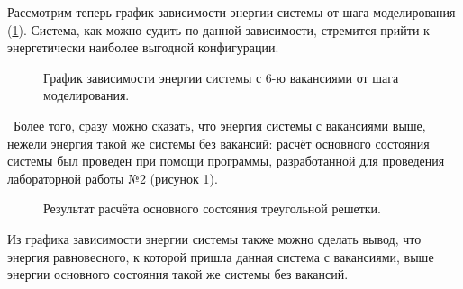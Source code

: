 \documentclass[14pt,a4paper,report]{ncc}
\begin{document}
Рассмотрим теперь график зависимости энергии системы от шага моделирования (\ref{ris:image3}). Система, как можно судить по данной зависимости, стремится прийти к энергетически наиболее выгодной конфигурации. 
\begin{figure}[h]
\caption{График зависимости энергии системы с 6-ю вакансиями от шага моделирования.}
\label{ris:image3}
\end{figure}
\
Более того, сразу можно сказать, что энергия системы с вакансиями выше, нежели энергия такой же системы без вакансий: расчёт основного состояния системы был проведен при помощи программы, разработанной для проведения лабораторной работы №2 (рисунок \ref{ris:image3}).
\begin{figure}[h]
\caption{Результат расчёта основного состояния треугольной решетки.}
\label{ris:image4}
\end{figure}
Из графика зависимости энергии системы также можно сделать вывод, что энергия равновесного, к которой пришла данная система с вакансиями, выше энергии основного состояния такой же системы без вакансий.
\
\end{document}
